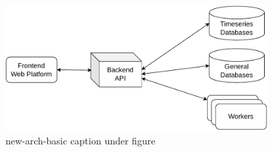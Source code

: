 \begin{figure}[!htbp]
    \centering
    \includegraphics[width=0.90\textwidth]{img/diagrams/pdf/new-arch-basic.drawio.pdf}
    \caption[new-arch-basic listing]{new-arch-basic caption under figure}
    \label{fig:new-arch-basic}
\end{figure}
